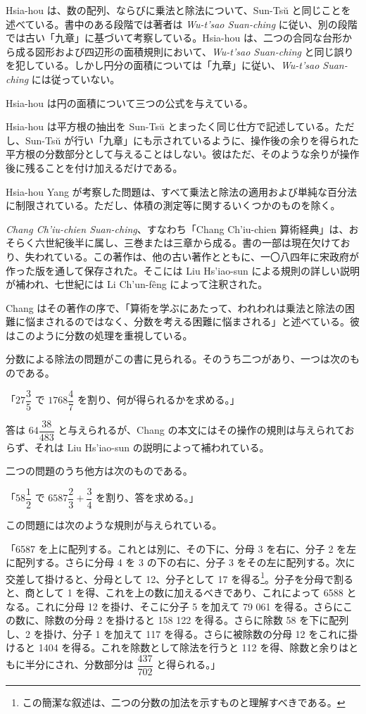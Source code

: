 \documentclass[11pt]{article}
\newcommand{\scanpage}[2]{\clearpage\setcounter{footnote}{0}\noindent{\footnotesize\color{gray}PDF #1 頁 · #2}\par\medskip}
\newcommand{\scanfooter}{}
\begin{document}
Hsia-hou は、数の配列、ならびに乗法と除法について、Sun-Tsŭ と同じことを述べている。書中のある段階では著者は \emph{Wu-t'sao Suan-ching} に従い、別の段階では古い「九章」に基づいて考察している。Hsia-hou は、二つの合同な台形から成る図形および四辺形の面積規則において、\emph{Wu-t'sao Suan-ching} と同じ誤りを犯している。しかし円分の面積については「九章」に従い、\emph{Wu-t'sao Suan-ching} には従っていない。

Hsia-hou は円の面積について三つの公式を与えている。

Hsia-hou は平方根の抽出を Sun-Tsŭ とまったく同じ仕方で記述している。ただし、Sun-Tsŭ が行い「九章」にも示されているように、操作後の余りを得られた平方根の分数部分として与えることはしない。彼はただ、そのような余りが操作後に残ることを付け加えるだけである。

Hsia-hou Yang が考察した問題は、すべて乗法と除法の適用および単純な百分法に制限されている。ただし、体積の測定等に関するいくつかのものを除く。

\emph{Chang Ch'iu-chien Suan-ching}、すなわち「Chang Ch'iu-chien 算術経典」は、おそらく六世紀後半に属し、三巻または三章から成る。書の一部は現在欠けており、失われている。この著作は、他の古い著作とともに、一〇八四年に宋政府が作った版を通して保存された。そこには Liu Hs'iao-sun による規則の詳しい説明が補われ、七世紀には Li Ch'un-fêng によって注釈された。

Chang はその著作の序で、「算術を学ぶにあたって、われわれは乗法と除法の困難に悩まされるのではなく、分数を考える困難に悩まされる」と述べている。彼はこのように分数の処理を重視している。

分数による除法の問題がこの書に見られる。そのうち二つがあり、一つは次のものである。

「$27\dfrac{3}{5}$ で $1768\dfrac{4}{7}$ を割り、何が得られるかを求める。」
\scanfooter

\scanpage{0054}{第一部、印刷頁40}

答は $64\dfrac{38}{483}$ と与えられるが、Chang の本文にはその操作の規則は与えられておらず、それは Liu Hs'iao-sun の説明によって補われている。

二つの問題のうち他方は次のものである。

「$58\dfrac{1}{2}$ で $6587\dfrac{2}{3}+\dfrac{3}{4}$ を割り、答を求める。」

この問題には次のような規則が与えられている。

「6587 を上に配列する。これとは別に、その下に、分母 3 を右に、分子 2 を左に配列する。さらに分母 4 を 3 の下の右に、分子 3 をその左に配列する。次に交差して掛けると、分母として 12、分子として 17 を得る\footnote{この簡潔な叙述は、二つの分数の加法を示すものと理解すべきである。}。分子を分母で割ると、商として 1 を得、これを上の数に加えるべきであり、これによって 6588 となる。これに分母 12 を掛け、そこに分子 5 を加えて 79 061 を得る。さらにこの数に、除数の分母 2 を掛けると 158 122 を得る。さらに除数 58 を下に配列し、2 を掛け、分子 1 を加えて 117 を得る。さらに被除数の分母 12 をこれに掛けると 1404 を得る。これを除数として除法を行うと 112 を得、除数と余りはともに半分にされ、分数部分は $\dfrac{437}{702}$ と得られる。」
\end{document}
